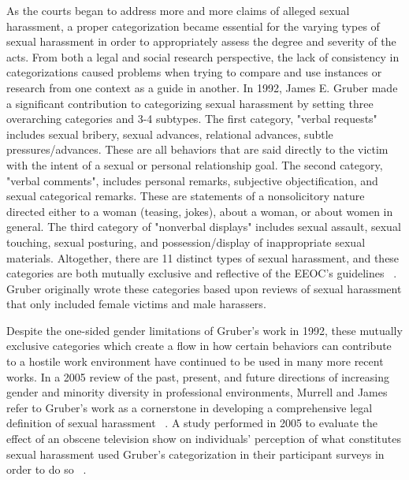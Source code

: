 As the courts began to address more and more claims of alleged sexual harassment, a proper categorization became essential for the varying types of sexual harassment in order to appropriately assess the degree and severity of the acts. From both a legal and social research perspective, the lack of consistency in categorizations caused problems when trying to compare and use instances or research from one context as a guide in another. In 1992, James E. Gruber made a significant contribution to categorizing sexual harassment by setting three overarching categories and 3-4 subtypes. The first category, "verbal requests" includes sexual bribery, sexual advances, relational advances, subtle pressures/advances. These are all behaviors that are said directly to the victim with the intent of a sexual or personal relationship goal. The second category, "verbal comments", includes personal remarks, subjective objectification, and sexual categorical remarks. These are statements of a nonsolicitory nature directed either to a woman (teasing, jokes), about a woman, or about women in general. The third category of "nonverbal displays" includes sexual assault, sexual touching, sexual posturing, and possession/display of inappropriate sexual materials. Altogether, there are 11 distinct types of sexual harassment, and these categories are both mutually exclusive and reflective of the EEOC's guidelines ~\cite{gruber1992topology}. Gruber originally wrote these categories based upon reviews of sexual harassment that only included female victims and male harassers.

Despite the one-sided gender limitations of Gruber's work in 1992, these mutually exclusive categories which create a flow in how certain behaviors can contribute to a hostile work environment have continued to be used in many more recent works. In a 2005 review of the past, present, and future directions of increasing gender and minority diversity in professional environments, Murrell and James refer to Gruber's work as a cornerstone in developing a comprehensive legal definition of sexual harassment ~\cite{murrell2002pastpresentfuture}. A study performed in 2005 to evaluate the effect of an obscene television show on individuals' perception of what constitutes sexual harassment used Gruber's categorization in their participant surveys in order to do so ~\cite{berlin2005gruberverification}.

